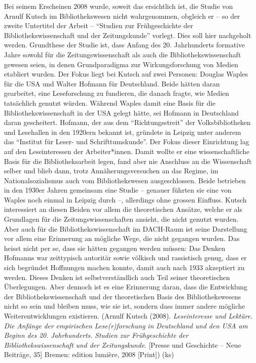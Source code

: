 \documentclass[a4paper,
fontsize=11pt,
oneside,
numbers=noperiodatend,
parskip=half-,
bibliography=totoc,
final
]{scrartcl}
\begin{document}
Bei seinem Erscheinen 2008 wurde, soweit das ersichtlich ist, die Studie
von Arnulf Kutsch im Bibliothekswesen nicht wahrgenommen, obgleich er --
so der zweite Untertitel der Arbeit -- \enquote{Studien zur
Frühgeschichte der Bibliothekswissenschaft und der Zeitungskunde}
vorlegt. Dies soll hier nachgeholt werden. Grundthese der Studie ist,
dass Anfang des 20. Jahrhunderts formative Jahre sowohl für die
Zeitungswissenschaft als auch die Bibliothekswissenschaft gewesen seien,
in denen Grundparadigma zur Wirkungsforschung von Medien etabliert
wurden. Der Fokus liegt bei Kutsch auf zwei Personen: Douglas Waples für
die USA und Walter Hofmann für Deutschland. Beide hätten daran
gearbeitet, eine Leseforschung zu fundieren, die danach fragte, wie
Medien tatsächlich genutzt würden. Während Waples damit eine Basis für
die Bibliothekswissenschaft in der USA gelegt hätte, sei Hofmann in
Deutschland daran gescheitert. Hofmann, der aus dem
\enquote{Richtungsstreit} der Volksbibliotheken und Lesehallen in den
1920ern bekannt ist, gründete in Leipzig unter anderem das
\enquote{Institut für Leser- und Schrifttumskunde}. Der Fokus dieser
Einrichtung lag auf den Leseinteressen der Arbeiter*innen. Damit wollte
er eine wissenschaftliche Basis für die Bibliotheksarbeit legen, fand
aber nie Anschluss an die Wissenschaft selber und blieb dann, trotz
Annäherungsversuchen an das Regime, im Nationalsozialismus auch vom
Bibliothekswesen ausgeschlossen. Beide betrieben in den 1930er Jahren
gemeinsam eine Studie -- genauer führten sie eine von Waples noch einmal
in Leipzig durch --, allerdings ohne grossen Einfluss. Kutsch
interessiert an diesen Beiden vor allem die theoretischen Ansätze,
welche er als Grundlagen für die Zeitungswissenschaften ansieht, die
nicht genutzt wurden. Aber auch für die Bibliothekswissenschaft im
DACH-Raum ist seine Darstellung vor allem eine Erinnerung an mögliche
Wege, die nicht gegangen wurden. Das heisst nicht per se, dass sie
hätten gegangen werden müssen: Das Denken Hofmanns war zeittypisch
autoritär sowie völkisch und rassistisch genug, dass er sich begründet
Hoffnungen machen konnte, damit auch nach 1933 akzeptiert zu werden.
Dieses Denken ist selbstverständlich auch Teil seiner theoretischen
Überlegungen. Aber dennoch ist es eine Erinnerung daran, dass die
Entwicklung der Bibliothekswissenschaft und der theoretischen Basis des
Bibliothekswesens nicht so sein und bleiben muss, wie sie ist, sondern
dass immer andere mögliche Weiterentwicklungen existieren. (Arnulf
Kutsch (2008). \emph{Leseinteresse und Lektüre. Die Anfänge der
empirischen Lese(r)forschung in Deutschland und den USA am Beginn des
20. Jahrhunderts. Studien zur Frühgeschichte der Bibliothekswissenschaft
und der Zeitungskunde}. {[}Presse und Geschichte -- Neue Beiträge, 35{]}
Bremen: edition lumière, 2008 {[}Print{]}) (ks)
\end{document}

